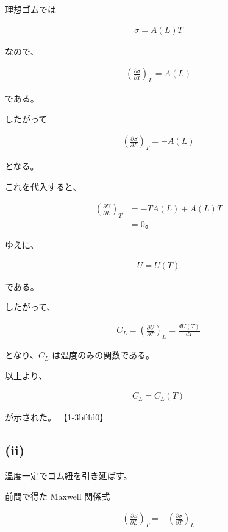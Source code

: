\documentclass[platex,dvipdfmx,a4paper]{jsarticle}
\begin{document}
理想ゴムでは

\begin{align*}
\sigma=A(L)T
\end{align*}

なので、

\begin{align*}
\left(
\frac{\partial \sigma}{\partial T}
\right)_L
=
A(L)
\end{align*}

である。

したがって

\begin{align*}
\left(
\frac{\partial S}{\partial L}
\right)_T
=
-A(L)
\end{align*}

となる。

これを代入すると、

\begin{align*}
\left(
\frac{\partial U}{\partial L}
\right)_T
&=
-TA(L)+A(L)T \\
&=
0。
\end{align*}

ゆえに、

\begin{align*}
U=U(T)
\end{align*}

である。

したがって、

\begin{align*}
C_L
=
\left(
\frac{\partial U}{\partial T}
\right)_L
=
\frac{dU(T)}{dT}
\end{align*}

となり、$C_L$ は温度のみの関数である。

以上より、

\begin{align*}
C_L=C_L(T)
\end{align*}

が示された。 【1-3bf4d0】

\subsection{(ii)}

温度一定でゴム紐を引き延ばす。

前問で得た Maxwell 関係式

\begin{align*}
\left(
\frac{\partial S}{\partial L}
\right)_T
=
-\left(
\frac{\partial \sigma}{\partial T}
\right)_L
\end{align*}
\end{document}
